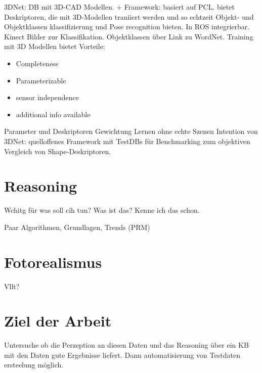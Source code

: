 \cite{3dnet} \newline
3DNet: DB mit 3D-CAD Modellen. + Framework: basiert auf PCL. bietet Deskriptoren, die mit 3D-Modellen traniiert werden und so echtzeit Objekt- und Objektklassen klassifizierung und Pose recognition bieten. In ROS integrierbar. Kinect Bilder zur Klassifikation. \newline
Objektklassen über Link zu WordNet. \newline 
Training mit 3D Modellen bietet Vorteile: 
\begin{itemize}
	\item Completeness
	\item Parameterizable
	\item sensor independence
	\item additional info available
\end{itemize}
Parameter und Deskriptoren Gewichtung Lernen ohne echte Szenen \newline
Intention von 3DNet: quelloffenes Framework mit TestDBs für Benchmarking zum objektiven Vergleich von Shape-Deskriptoren. \par



\section{Reasoning}

Wchitg für was soll cih tun? Was ist das? Kenne ich das schon.

Paar Algorithmen, Grundlagen, Trends (PRM) 

\section{Fotorealismus}

Vllt?

\section{Ziel der Arbeit}
\label{sec:goal}

Untersuche ob die Perzeption an diesen Daten und das Reasoning über ein KB mit den Daten gute Ergebnisse liefert. Dann automatisierung von Testdaten ersteelung möglich. 